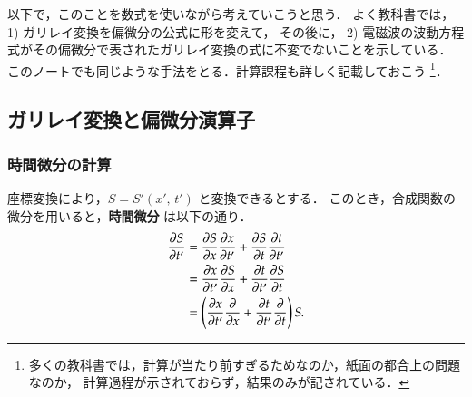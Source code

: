             以下で，このことを数式を使いながら考えていこうと思う．
            よく教科書では，
                1) ガリレイ変換を偏微分の公式に形を変えて，
            その後に，
                 2) 電磁波の波動方程式がその偏微分で表されたガリレイ変換の式に不変でないことを示している．
            このノートでも同じような手法をとる．計算課程も詳しく記載しておこう
                \footnote{
                    多くの教科書では，計算が当たり前すぎるためなのか，紙面の都合上の問題なのか，
                    計算過程が示されておらず，結果のみが記されている．
                }．

        \subsection{ガリレイ変換と偏微分演算子}
            \subsubsection{時間微分の計算}
                座標変換により，$S=S'(x',\,t')$ と変換できるとする．
                このとき，合成関数の微分を用いると，\textbf{時間微分} は以下の通り．
                    \begin{align*}
                        \frac{\partial S }{\partial t'} &=   \frac{\partial S }{\partial x } \frac{\partial x }{\partial t'}
                                                + \frac{\partial S }{\partial t } \frac{\partial t }{\partial t'} \\
                                            &=   \frac{\partial x }{\partial t'} \frac{\partial S }{\partial x }
                                                + \frac{\partial t }{\partial t'} \frac{\partial S }{\partial t } \\
                                            &=   \left(
                                                \frac{\partial x }{\partial t'} \frac{\partial   }{\partial x }
                                                + \frac{\partial t }{\partial t'} \frac{\partial   }{\partial t }
                                                \right) S.
                    \end{align*}

